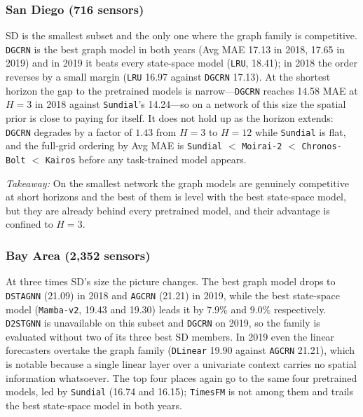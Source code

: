 \subsubsection{San Diego (716 sensors)}
\label{app:extended:sd}

SD is the smallest subset and the only one where the graph family is
competitive. \texttt{DGCRN} is the best graph model in both years (Avg MAE
17.13 in 2018, 17.65 in 2019) and in 2019 it beats every state-space model
(\texttt{LRU}, 18.41); in 2018 the order reverses by a small margin
(\texttt{LRU} 16.97 against \texttt{DGCRN} 17.13). At the shortest horizon the
gap to the pretrained models is narrow---\texttt{DGCRN} reaches 14.58 MAE at
$H{=}3$ in 2018 against \texttt{Sundial}'s 14.24---so on a network of this size
the spatial prior is close to paying for itself. It does not hold up as the
horizon extends: \texttt{DGCRN} degrades by a factor of $1.43$ from $H{=}3$ to
$H{=}12$ while \texttt{Sundial} is flat, and the full-grid ordering by Avg MAE
is \texttt{Sundial} $<$ \texttt{Moirai-2} $<$ \texttt{Chronos-Bolt} $<$
\texttt{Kairos} before any task-trained model appears.

\begin{insightbox}
\textit{Takeaway:} On the smallest network the graph models are genuinely
competitive at short horizons and the best of them is level with the best
state-space model, but they are already behind every pretrained model, and
their advantage is confined to $H{=}3$.
\end{insightbox}

\subsubsection{Bay Area (2,352 sensors)}
\label{app:extended:gba}

At three times SD's size the picture changes. The best graph model drops to
\texttt{DSTAGNN} (21.09) in 2018 and \texttt{AGCRN} (21.21) in 2019, while the
best state-space model (\texttt{Mamba-v2}, 19.43 and 19.30) leads it by $7.9\%$
and $9.0\%$ respectively. \texttt{D2STGNN} is unavailable on this subset and
\texttt{DGCRN} on 2019, so the family is evaluated without two of its three best
SD members. In 2019 even the linear forecasters overtake the graph family
(\texttt{DLinear} 19.90 against \texttt{AGCRN} 21.21), which is notable because
a single linear layer over a univariate context carries no spatial information
whatsoever. The top four places again go to the same four pretrained models, led
by \texttt{Sundial} (16.74 and 16.15); \texttt{TimesFM} is not among them and
trails the best state-space model in both years.

